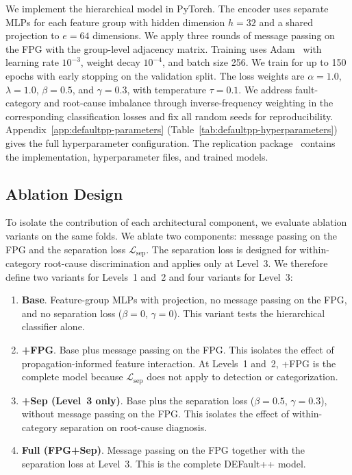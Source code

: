 We implement the hierarchical model in PyTorch. The encoder uses separate MLPs for each feature group with hidden dimension $h = 32$ and a shared projection to $e = 64$ dimensions. We apply three rounds of message passing on the FPG with the group-level adjacency matrix. Training uses Adam~\cite{kingma2015adam} with learning rate $10^{-3}$, weight decay $10^{-4}$, and batch size 256. We train for up to 150 epochs with early stopping on the validation split. The loss weights are $\alpha = 1.0$, $\lambda = 1.0$, $\beta = 0.5$, and $\gamma = 0.3$, with temperature $\tau = 0.1$. We address fault-category and root-cause imbalance through inverse-frequency weighting in the corresponding classification losses and fix all random seeds for reproducibility. Appendix~\ref{app:defaultpp-parameters} (Table~\ref{tab:defaultpp-hyperparameters}) gives the full hyperparameter configuration. The replication package~\cite{defaultpp_repo} contains the implementation, hyperparameter files, and trained models.

\subsection{Ablation Design}

To isolate the contribution of each architectural component, we evaluate ablation variants on the same folds. We ablate two components: message passing on the FPG and the separation loss $\mathcal{L}_{\text{sep}}$. The separation loss is designed for within-category root-cause discrimination and applies only at Level~3. We therefore define two variants for Levels~1 and~2 and four variants for Level~3:

\begin{enumerate}[nosep]
\item \textbf{Base}. Feature-group MLPs with projection, no message passing on the FPG, and no separation loss ($\beta = 0$, $\gamma = 0$). This variant tests the hierarchical classifier alone.
\item \textbf{+FPG}. Base plus message passing on the FPG. This isolates the effect of propagation-informed feature interaction. At Levels~1 and~2, +FPG is the complete model because $\mathcal{L}_{\text{sep}}$ does not apply to detection or categorization.
\item \textbf{+Sep (Level~3 only)}. Base plus the separation loss ($\beta = 0.5$, $\gamma = 0.3$), without message passing on the FPG. This isolates the effect of within-category separation on root-cause diagnosis.
\item \textbf{Full (FPG+Sep)}. Message passing on the FPG together with the separation loss at Level~3. This is the complete DEFault++ model.
\end{enumerate}

